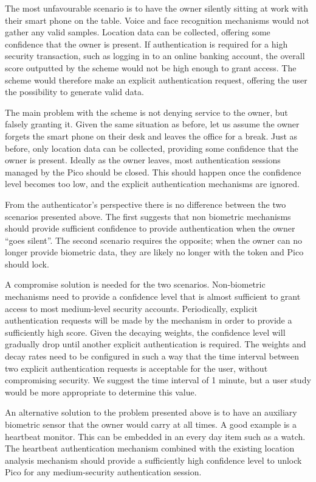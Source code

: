The most unfavourable scenario is to have the owner silently sitting at work with their smart phone on the table. Voice and face recognition mechanisms would not gather any valid samples. Location data can be collected, offering some confidence that the owner is present. If authentication is required for a high security transaction, such as logging in to an online banking account, the overall score outputted by the scheme would not be high enough to grant access. The scheme would therefore make an explicit authentication request, offering the user the possibility to generate valid data.

The main problem with the scheme is not denying service to the owner, but falsely granting it. Given the same situation as before, let us assume the owner forgets the smart phone on their desk and leaves the office for a break. Just as before, only location data can be collected, providing some confidence that the owner is present. Ideally as the owner leaves, most authentication sessions managed by the Pico should be closed. This should happen once the confidence level becomes too low, and the explicit authentication mechanisms are ignored.

From the authenticator's perspective there is no difference between the two scenarios presented above. The first suggests that non biometric mechanisms should provide sufficient confidence to provide authentication when the owner ``goes silent''. The second scenario requires the opposite; when the owner can no longer provide biometric data, they are likely no longer with the token and Pico should lock. 

A compromise solution is needed for the two scenarios. Non-biometric mechanisms need to provide a confidence level that is almost sufficient to grant access to most medium-level security accounts. Periodically, explicit authentication requests will be made by the mechanism in order to provide a sufficiently high score. Given the decaying weights, the confidence level will gradually drop until another explicit authentication is required. The weights and decay rates need to be configured in such a way that the time interval between two explicit authentication requests is acceptable for the user, without compromising security. We suggest the time interval of 1 minute, but a user study would be more appropriate to determine this value.

An alternative solution to the problem presented above is to have an auxiliary biometric sensor that the owner would carry at all times. A good example is a heartbeat monitor. This can be embedded in an every day item such as a watch. The heartbeat authentication mechanism combined with the existing location analysis mechanism should provide a sufficiently high confidence level to unlock Pico for any medium-security authentication session.

